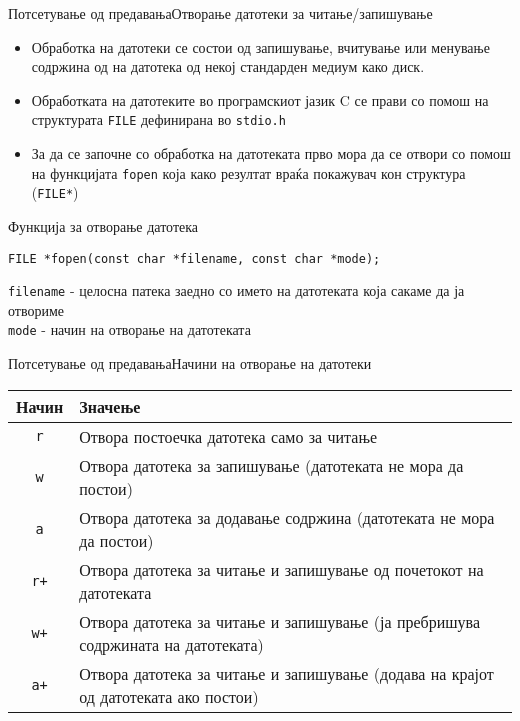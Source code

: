 
\begin{frame}[fragile]{Потсетување од предавања}{Отворање датотеки за
читање/запишување}

\begin{itemize}
  \item Обработка на датотеки се состои од запишување, вчитување или менување содржина
од на датотека од некој стандарден медиум како диск.
  \item Обработката на датотеките во програмскиот јазик C се прави со помош на
  структурата \texttt{FILE} дефинирана во \texttt{stdio.h}
  \item За да се започне со обработка на датотеката прво мора да се отвори со
  помош на функцијата \texttt{fopen} која како резултат враќа покажувач кон
  структура (\texttt{FILE*})
\end{itemize}
\begin{exampleblock}{Функција за отворање датотека}
\begin{lstlisting}
FILE *fopen(const char *filename, const char *mode);
\end{lstlisting}
\begin{scriptsize}
\texttt{filename} - целосна патека заедно со името на датотеката која сакаме да
ја отвориме\\
\texttt{mode} - начин на отворање на датотеката
\end{scriptsize}
\end{exampleblock}
\end{frame}

\begin{frame}{Потсетување од предавања}{Начини на отворање на датотеки}
\begin{tabular}{| c | p{} |}
\hline
\textbf{Начин} & \textbf{Значење}\\
\hline
\texttt{r}  &  Отвора постоечка датотека само за читање\\
\hline
\texttt{w} & Отвора датотека за запишување (датотеката не мора да постои)\\
\hline
 \texttt{a} & Отвора датотека за додавање содржина (датотеката не мора да
 постои)\\
 \hline
 \texttt{r+} & Отвора датотека за читање и запишување од почетокот на датотеката\\
 \hline
 \texttt{w+} & Отвора датотека за читање и запишување (ја пребришува
 содржината на датотеката)\\
 \hline
 \texttt{a+} & Отвора датотека за читање и запишување (додава на крајот од
 датотеката ако постои)\\
 \hline
\end{tabular}
\end{frame}

